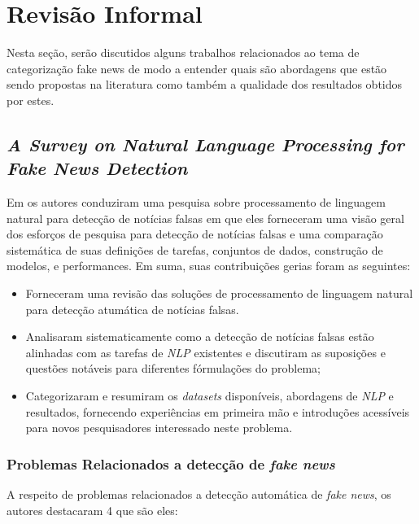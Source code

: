 \section{Revisão Informal}

Nesta seção, serão discutidos alguns trabalhos relacionados ao tema de
categorização fake news de modo a entender quais são abordagens que estão sendo
propostas na literatura como também a qualidade dos resultados obtidos por estes.

\subsection{\textit{A Survey on Natural Language Processing for Fake News Detection}}

Em \cite{oshikawa2020} os autores conduziram uma pesquisa sobre processamento de linguagem natural para detecção de notícias falsas em que eles forneceram uma visão geral dos esforços de pesquisa para detecção de notícias falsas e uma comparação sistemática de suas definições de tarefas, conjuntos de dados, construção de modelos, e performances. Em suma, suas contribuições gerias foram as seguintes: \\

\begin{itemize}
    \item Forneceram uma revisão das soluções de processamento de linguagem natural para detecção atumática de notícias falsas.
    
    \item Analisaram sistematicamente como a detecção de notícias falsas estão alinhadas com as tarefas de \textit{NLP} existentes e discutiram as suposições e questões notáveis para diferentes fórmulações do problema;
    
    \item Categorizaram e resumiram os \textit{datasets} disponíveis, abordagens de \textit{NLP} e resultados, fornecendo experiências em primeira mão e introduções acessíveis para novos pesquisadores interessado neste problema.
\end{itemize}

\subsubsection{Problemas Relacionados a detecção de \textit{fake news}}

A respeito de problemas relacionados a detecção automática de \textit{fake news}, os autores destacaram 4 que são eles: \\

